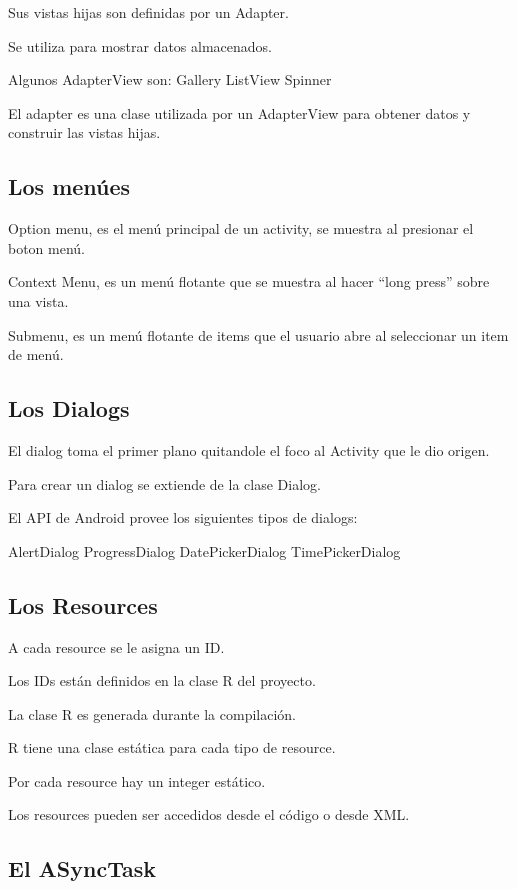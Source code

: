 Sus vistas hijas son definidas por un Adapter.

Se utiliza para mostrar datos almacenados.

Algunos AdapterView son:
Gallery
ListView
Spinner

El adapter es una clase utilizada por un AdapterView para obtener datos y  construir las vistas hijas.

\subsection{Los men\'ues}
\label{subsec:dev.menus}

Option menu, es el men\'u principal de un activity, se muestra  al presionar el boton men\'u.

Context Menu, es un men\'u flotante que se muestra al hacer  “long press” sobre una vista.

Submenu, es un men\'u flotante de items que el usuario abre al  seleccionar un item de men\'u.

\subsection{Los Dialogs}
\label{subsec:dev.dialogs}

El dialog toma el primer plano quitandole el foco al Activity  que le dio origen.

Para crear un dialog se extiende de la clase Dialog.

El API de Android provee los siguientes tipos de dialogs:

AlertDialog
ProgressDialog
DatePickerDialog
TimePickerDialog

\subsection{Los Resources}
\label{subsec:dev.resources}

A cada resource se le asigna un ID.

Los IDs est\'an definidos en la clase R del proyecto.

La clase R es generada durante la compilaci\'on.

R tiene una clase est\'atica para cada tipo de resource.

Por cada resource hay un integer est\'atico.

Los resources pueden ser accedidos desde el c\'odigo o desde XML.

\subsection{El ASyncTask}
\label{subsec:dev.asynctask}

